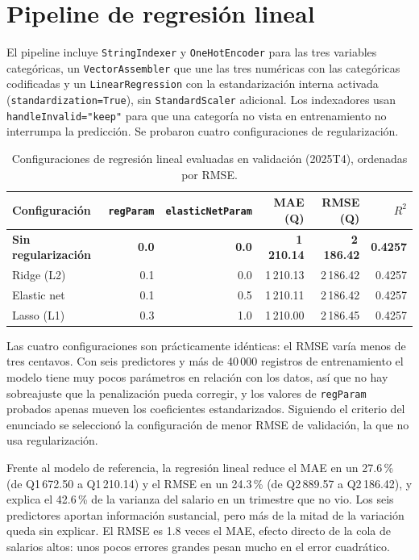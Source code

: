 \documentclass[11pt,a4paper]{article}
\newcommand{\var}[1]{\texttt{#1}}
\begin{document}
\section{Pipeline de regresión lineal}

El pipeline incluye \var{StringIndexer} y \var{OneHotEncoder} para las tres variables categóricas, un \var{VectorAssembler} que une las tres numéricas con las categóricas codificadas y un \var{LinearRegression} con la estandarización interna activada (\var{standardization=True}), sin \var{StandardScaler} adicional. Los indexadores usan \var{handleInvalid="keep"} para que una categoría no vista en entrenamiento no interrumpa la predicción. Se probaron cuatro configuraciones de regularización.

\begin{table}[H]
\centering
\caption{Configuraciones de regresión lineal evaluadas en validación (2025T4), ordenadas por RMSE.}
\label{tab:lr}
\small
\begin{tabular}{lrrrrr}
\toprule
Configuración & \var{regParam} & \var{elasticNetParam} & MAE (Q) & RMSE (Q) & $R^2$ \\
\midrule
\textbf{Sin regularización} & \textbf{0.0} & \textbf{0.0} & \textbf{1\,210.14} & \textbf{2\,186.42} & \textbf{0.4257} \\
Ridge (L2) & 0.1 & 0.0 & 1\,210.13 & 2\,186.42 & 0.4257 \\
Elastic net & 0.1 & 0.5 & 1\,210.11 & 2\,186.42 & 0.4257 \\
Lasso (L1) & 0.3 & 1.0 & 1\,210.00 & 2\,186.45 & 0.4257 \\
\bottomrule
\end{tabular}
\end{table}

Las cuatro configuraciones son prácticamente idénticas: el RMSE varía menos de tres centavos. Con seis predictores y más de 40\,000 registros de entrenamiento el modelo tiene muy pocos parámetros en relación con los datos, así que no hay sobreajuste que la penalización pueda corregir, y los valores de \var{regParam} probados apenas mueven los coeficientes estandarizados. Siguiendo el criterio del enunciado se seleccionó la configuración de menor RMSE de validación, la que no usa regularización.

Frente al modelo de referencia, la regresión lineal reduce el MAE en un 27.6\,\% (de Q1\,672.50 a Q1\,210.14) y el RMSE en un 24.3\,\% (de Q2\,889.57 a Q2\,186.42), y explica el 42.6\,\% de la varianza del salario en un trimestre que no vio. Los seis predictores aportan información sustancial, pero más de la mitad de la variación queda sin explicar. El RMSE es 1.8 veces el MAE, efecto directo de la cola de salarios altos: unos pocos errores grandes pesan mucho en el error cuadrático.
\end{document}
